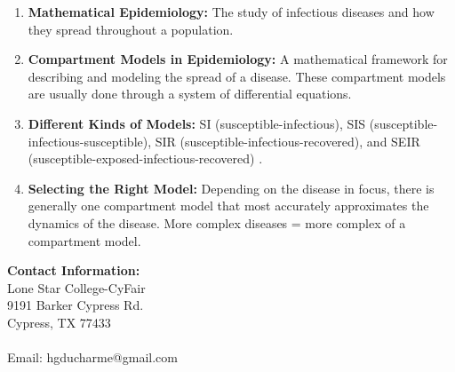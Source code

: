 \documentclass[a0, landscape, final]{a0poster}
\begin{document}
\begin{multicols}{4}
\begin{definition*}[\textcolor{white}{Introduction}]
\begin{enumerate}
	\item{\textcolor{BrickRed}{\textbf{Mathematical Epidemiology:}} The study of infectious diseases and how they spread throughout a population.} 
	\item{\textcolor{BrickRed}{\textbf{Compartment Models in Epidemiology: }} A mathematical framework for describing and modeling the spread of a disease. These compartment models are usually done through a system of differential equations.}
	\item{\textcolor{BrickRed}{\textbf{Different Kinds of Models:}} SI (susceptible-infectious), SIS (susceptible-infectious-susceptible), SIR (susceptible-infectious-recovered), and SEIR (susceptible-exposed-infectious-recovered) \cite{Chitnis:2011aa}. }
	\item{\textcolor{BrickRed}{\textbf{Selecting the Right Model:}} Depending on the disease in focus, there is generally one compartment model that most accurately approximates the dynamics of the disease. More complex diseases = more complex of a compartment model.}
\end{enumerate}

\end{definition*}

\vspace{1.5em}

\begin{minipage}[b]{\linewidth}
\begin{center}
\begin{minipage}[b]{0.75\linewidth}
\Large \textbf{Contact Information:}\\
Lone Star College-CyFair \\
9191 Barker Cypress Rd. \\ 
Cypress, TX 77433 \\\\
Email: hgducharme@gmail.com
\end{minipage}
\end{center}
\end{minipage}


\vfill
\columnbreak


\color{Black} %


\end{multicols}
\end{document}
